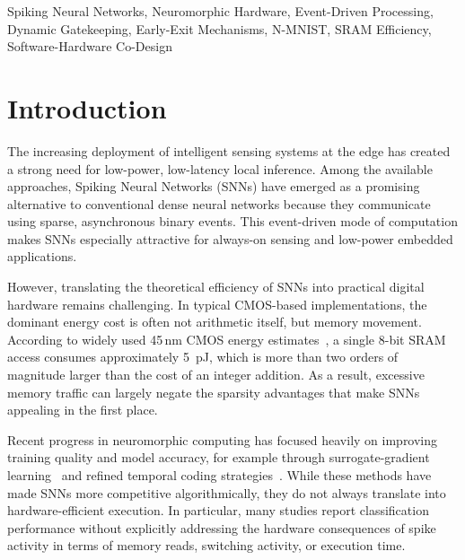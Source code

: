 \documentclass[conference]{IEEEtran}
\begin{document}
\begin{IEEEkeywords}
Spiking Neural Networks, Neuromorphic Hardware, Event-Driven Processing, Dynamic Gatekeeping, Early-Exit Mechanisms, N-MNIST, SRAM Efficiency, Software-Hardware Co-Design
\end{IEEEkeywords}

\section{Introduction}
The increasing deployment of intelligent sensing systems at the edge has created a strong need for low-power, low-latency local inference. Among the available approaches, Spiking Neural Networks (SNNs) have emerged as a promising alternative to conventional dense neural networks because they communicate using sparse, asynchronous binary events. This event-driven mode of computation makes SNNs especially attractive for always-on sensing and low-power embedded applications.

However, translating the theoretical efficiency of SNNs into practical digital hardware remains challenging. In typical CMOS-based implementations, the dominant energy cost is often not arithmetic itself, but memory movement. According to widely used 45\,nm CMOS energy estimates~\cite{horowitz2014energy}, a single 8-bit SRAM access consumes approximately 5~pJ, which is more than two orders of magnitude larger than the cost of an integer addition. As a result, excessive memory traffic can largely negate the sparsity advantages that make SNNs appealing in the first place.

Recent progress in neuromorphic computing has focused heavily on improving training quality and model accuracy, for example through surrogate-gradient learning~\cite{neftci2019surrogate} and refined temporal coding strategies~\cite{zenke2021remarkable}. While these methods have made SNNs more competitive algorithmically, they do not always translate into hardware-efficient execution. In particular, many studies report classification performance without explicitly addressing the hardware consequences of spike activity in terms of memory reads, switching activity, or execution time.
\end{document}
